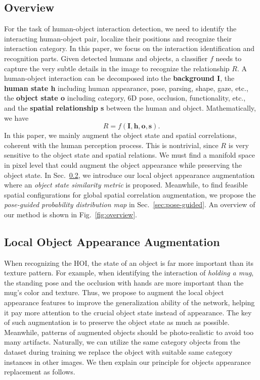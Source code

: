 \documentclass[10pt,twocolumn,letterpaper]{article}
\begin{document}
\subsection{Overview}
For the task of human-object interaction detection, we need to identify the interacting human-object pair, localize their positions and recognize their interaction category. In this paper, we focus on the interaction identification and recognition parts. Given detected humans and objects, a classifier $f$ needs to capture the very subtle details in the image to recognize the relationship $R$. A human-object interaction can be decomposed into the \textbf{background I}, the \textbf{human state h} including human appearance, pose, parsing, shape, gaze, etc., the \textbf{object state o} including category, 6D pose, occlusion, functionality, etc., and the \textbf{spatial relationship s} between the human and object. Mathematically, we have
\begin{equation}
    R = f(\textbf{I}, \textbf{h}, \textbf{o}, \textbf{s}).
\end{equation}
In this paper, we mainly augment the object state and spatial correlations, coherent with the human perception process.
This is nontrivial, since $R$ is very sensitive to the object state and spatial relations. We must find a manifold space in pixel level that could augment the object appearance while preserving the object state. In Sec.~\ref{sec:object exchange}, we introduce our local object appearance augmentation where an \textit{object state similarity metric} is proposed. Meanwhile, to find feasible spatial configurations for global spatial correlation augmentation, we propose the \textit{pose-guided probability distribution map} in Sec.~\ref{sec:pose-guided}. An overview of our method is shown in Fig.~\ref{fig:overview}.

\subsection{Local Object Appearance Augmentation}
\label{sec:object exchange}
When recognizing the HOI, the state of an object is far more important than its texture pattern. For example, when identifying the interaction of \textit{holding a mug}, the standing pose and the occlusion with hands are more important than the mug's color and texture. Thus, we propose to augment the local object appearance features to improve the generalization ability of the network, helping it pay more attention to the crucial object state instead of appearance. The key of such augmentation is to preserve the object state as much as possible. Meanwhile, patterns of augmented objects should be photo-realistic to avoid too many artifacts. Naturally, we can utilize the same category objects from the dataset during training  we replace the object with suitable same category instances in other images. We then explain our principle for objects appearance replacement as follows.
\end{document}
